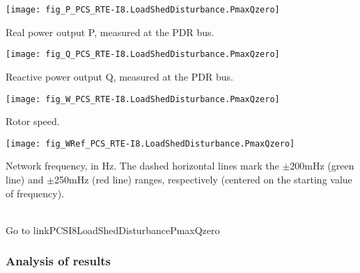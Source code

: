     \vspace{0.5cm}

    \noindent
    \begin{minipage}[t]{0.48\textwidth}
        \centering
        \texttt{[image: fig\_P\_PCS\_RTE-I8.LoadShedDisturbance.PmaxQzero]}
        \begin{minipage}[t]{0.8\textwidth}
            \small Real power output P, measured at the PDR bus.
        \end{minipage}
    \end{minipage}
    \hfill
    \begin{minipage}[t]{0.48\textwidth}
        \centering
        \texttt{[image: fig\_Q\_PCS\_RTE-I8.LoadShedDisturbance.PmaxQzero]}
        \begin{minipage}[t]{0.8\textwidth}
            \small Reactive power output Q, measured at the PDR bus.
        \end{minipage}
    \end{minipage}

    \vspace{0.5cm}

    \noindent
    \begin{minipage}[t]{0.48\textwidth}
        \centering
        \texttt{[image: fig\_W\_PCS\_RTE-I8.LoadShedDisturbance.PmaxQzero]}
        \begin{minipage}[t]{0.8\textwidth}
            \small Rotor speed.
        \end{minipage}
    \end{minipage}
    \hfill
    \begin{minipage}[t]{0.48\textwidth}
        \centering
        \texttt{[image: fig\_WRef\_PCS\_RTE-I8.LoadShedDisturbance.PmaxQzero]}
        \begin{minipage}[t]{0.8\textwidth}
            \small Network frequency, in Hz. The dashed horizontal lines mark
            the $\pm$200mHz (green line) and $\pm$250mHz (red line) ranges, respectively (centered on
            the starting value of frequency).
        \end{minipage}
    \end{minipage}
    \\[2\baselineskip]
    Go to  {{ linkPCSI8LoadShedDisturbancePmaxQzero }}


    \subsubsection{Analysis of results}

